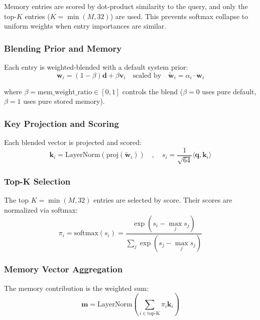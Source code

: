 \documentclass[12pt]{article}
\begin{document}
Memory entries are scored by dot-product similarity to the query,
and only the top-$K$ entries ($K = \min(M, 32)$) are used. This prevents
softmax collapse to uniform weights when entry importances are similar.

\subsubsection{Blending Prior and Memory}

Each entry is weighted-blended with a default system prior:
\begin{equation}
\mathbf{w}_i = (1 - \beta) \mathbf{d} + \beta \mathbf{v}_i
\quad \text{scaled by} \quad
\tilde{\mathbf{w}}_i = \alpha_i \cdot \mathbf{w}_i
\end{equation}

where $\beta = \text{mem\_weight\_ratio} \in [0, 1]$ controls the blend
($\beta = 0$ uses pure default, $\beta = 1$ uses pure stored memory).

\subsubsection{Key Projection and Scoring}

Each blended vector is projected and scored:
\begin{equation}
\mathbf{k}_i = \text{LayerNorm}(\text{proj}(\tilde{\mathbf{w}}_i))
\quad,\quad
s_i = \frac{1}{\sqrt{64}} \langle \mathbf{q}, \mathbf{k}_i \rangle
\end{equation}

\subsubsection{Top-K Selection}

The top $K = \min(M, 32)$ entries are selected by score. Their scores
are normalized via softmax:
\begin{equation}
\pi_i = \text{softmax}(s_i) = \frac{\exp(s_i - \max_j s_j)}
{\sum_j \exp(s_j - \max_j s_j)}
\end{equation}

\subsubsection{Memory Vector Aggregation}

The memory contribution is the weighted sum:
\begin{equation}
\mathbf{m} = \text{LayerNorm}\left(\sum_{i \in \text{top-K}}
\pi_i \mathbf{k}_i \right)
\end{equation}
\end{document}
